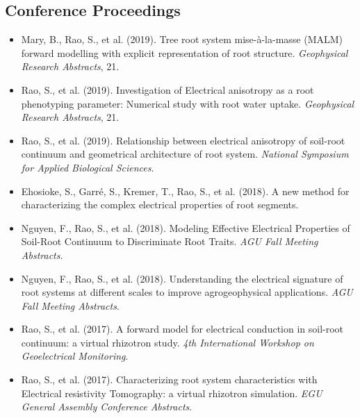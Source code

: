 \documentclass[11pt,a4paper]{article}
\begin{document}
\subsection*{Conference Proceedings}
\begin{itemize}[leftmargin=*]
    \item Mary, B., Rao, S., et al. (2019). Tree root system mise-à-la-masse (MALM) forward modelling with explicit representation of root structure. \textit{Geophysical Research Abstracts}, 21.
    \item Rao, S., et al. (2019). Investigation of Electrical anisotropy as a root phenotyping parameter: Numerical study with root water uptake. \textit{Geophysical Research Abstracts}, 21.
    \item Rao, S., et al. (2019). Relationship between electrical anisotropy of soil-root continuum and geometrical architecture of root system. \textit{National Symposium for Applied Biological Sciences}.
    \item Ehosioke, S., Garré, S., Kremer, T., Rao, S., et al. (2018). A new method for characterizing the complex electrical properties of root segments.
    \item Nguyen, F., Rao, S., et al. (2018). Modeling Effective Electrical Properties of Soil-Root Continuum to Discriminate Root Traits. \textit{AGU Fall Meeting Abstracts}.
    \item Nguyen, F., Rao, S., et al. (2018). Understanding the electrical signature of root systems at different scales to improve agrogeophysical applications. \textit{AGU Fall Meeting Abstracts}.
    \item Rao, S., et al. (2017). A forward model for electrical conduction in soil-root continuum: a virtual rhizotron study. \textit{4th International Workshop on Geoelectrical Monitoring}.
    \item Rao, S., et al. (2017). Characterizing root system characteristics with Electrical resistivity Tomography: a virtual rhizotron simulation. \textit{EGU General Assembly Conference Abstracts}.
\end{itemize}
\end{document}
